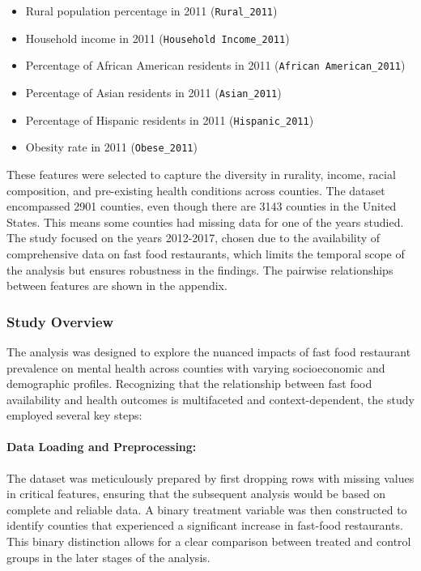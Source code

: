 \documentclass[letterpaper, 11pt]{report}
\begin{document}
\begin{itemize}
    \item Rural population percentage in 2011 (\texttt{Rural\_2011})
    \item Household income in 2011 (\texttt{Household Income\_2011})
    \item Percentage of African American residents in 2011 (\texttt{African American\_2011})
    \item Percentage of Asian residents in 2011 (\texttt{Asian\_2011})
    \item Percentage of Hispanic residents in 2011 (\texttt{Hispanic\_2011})
    \item Obesity rate in 2011 (\texttt{Obese\_2011})
\end{itemize}


These features were selected to capture the diversity in rurality, income, racial composition, and pre-existing health conditions across counties. The dataset encompassed 2901 counties, even though there are 3143 counties in the United States. This means some counties had missing data for one of the years studied. The study focused on the years 2012-2017, chosen due to the availability of comprehensive data on fast food restaurants, which limits the temporal scope of the analysis but ensures robustness in the findings. The pairwise relationships between features are shown in the appendix.

\subsubsection{Study Overview}
The analysis was designed to explore the nuanced impacts of fast food restaurant prevalence on mental health across counties with varying socioeconomic and demographic profiles. Recognizing that the relationship between fast food availability and health outcomes is multifaceted and context-dependent, the study employed several key steps:

\paragraph{Data Loading and Preprocessing:}
The dataset was meticulously prepared by first dropping rows with missing values in critical features, ensuring that the subsequent analysis would be based on complete and reliable data. A binary treatment variable was then constructed to identify counties that experienced a significant increase in fast-food restaurants. This binary distinction allows for a clear comparison between treated and control groups in the later stages of the analysis.
\end{document}
